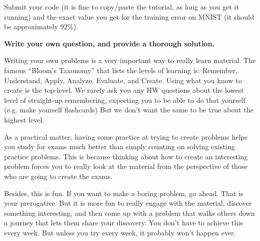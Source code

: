 Submit your code (it is fine to copy/paste the tutorial, as long as you get it running) and the exact value you get for the training error on MNIST (it should be approximately $92\%$).

{\bf Write your own question, and provide a thorough solution.}

Writing your own problems is a very important way to really learn
material. The famous ``Bloom's Taxonomy'' that lists the levels of
learning is: Remember, Understand, Apply, Analyze, Evaluate, and
Create. Using what you know to create is the top-level. We rarely ask
you any HW questions about the lowest level of straight-up
remembering, expecting you to be able to do that yourself. (e.g. make
yourself flashcards) But we don't want the same to be true about the
highest level.

As a practical matter, having some practice at trying to create
problems helps you study for exams much better than simply counting on
solving existing practice problems. This is because thinking about how
to create an interesting problem forces you to really look at the
material from the perspective of those who are going to create the
exams. 

Besides, this is fun. If you want to make a boring problem, go
ahead. That is your prerogative. But it is more fun to really engage
with the material, discover something interesting, and then come up
with a problem that walks others down a journey that lets them share
your discovery. You don't have to achieve this every week. But unless
you try every week, it probably won't happen ever. 